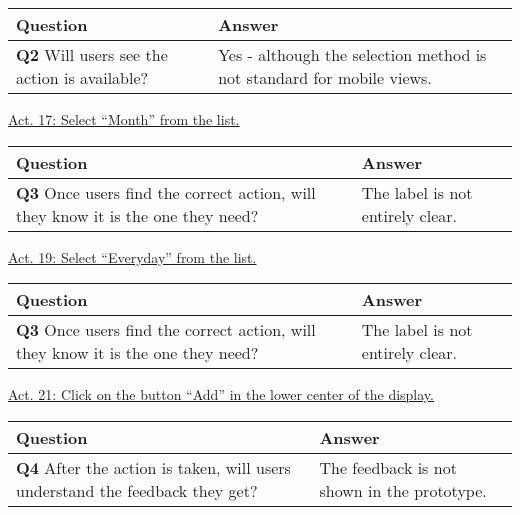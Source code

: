 \begin{table}[H]
	\begin{tabularx}{\textwidth}{|X|X|}
		\hline
		\textbf{Question} & \textbf{Answer} \\
		\hline
		\textbf{Q2} Will users see the action is available? & Yes - although the selection method is not standard for mobile views. \\
		\hline
	\end{tabularx}
\end{table}
\noindent
\underline{Act. 17: Select “Month” from the list.}
\begin{table}[H]
	\begin{tabularx}{\textwidth}{|X|X|}
		\hline
		\textbf{Question} & \textbf{Answer} \\
		\hline
		\textbf{Q3} Once users find the correct action, will they know it is the one they need? & The label is not entirely clear. \\
		\hline
	\end{tabularx}
\end{table}
\noindent
\underline{Act. 19: Select “Everyday” from the list.}
\begin{table}[H]
	\begin{tabularx}{\textwidth}{|X|X|}
		\hline
		\textbf{Question} & \textbf{Answer} \\
		\hline
		\textbf{Q3} Once users find the correct action, will they know it is the one they need? & The label is not entirely clear. \\
		\hline
	\end{tabularx}
\end{table}
\noindent
\underline{Act. 21: Click on the button “Add” in the lower center of the display.}
\begin{table}[H]
	\begin{tabularx}{\textwidth}{|X|X|}
		\hline
		\textbf{Question} & \textbf{Answer} \\
		\hline
		\textbf{Q4} After the action is taken, will users understand the feedback they get? & The feedback is not shown in the prototype. \\
		\hline
	\end{tabularx}
\end{table}
